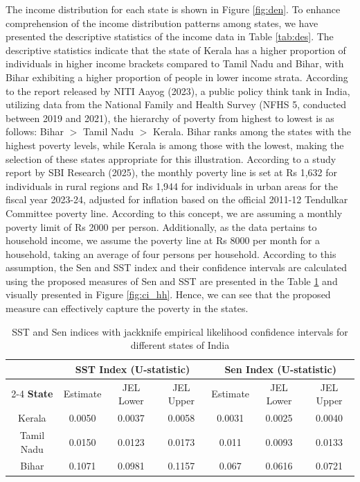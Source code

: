 \documentclass[11pt]{article}
\begin{document}
The income distribution for each state is shown in Figure \ref{fig:den}.  To enhance comprehension of the income distribution patterns among states, we have presented the descriptive statistics of the income data in Table \ref{tab:des}. The descriptive statistics indicate that the state of Kerala has a higher proportion of individuals in higher income brackets compared to Tamil Nadu and Bihar, with Bihar exhibiting a higher proportion of people in lower income strata. According to the report released by NITI Aayog (2023), a public policy think tank in India, utilizing data from the National Family and Health Survey (NFHS 5, conducted between 2019 and 2021), the hierarchy of poverty from highest to lowest is as follows: Bihar $>$ Tamil Nadu $>$ Kerala. Bihar ranks among the states with the highest poverty levels, while Kerala is among those with the lowest, making the selection of these states appropriate for this illustration. According to a study report by SBI Research (2025), the monthly poverty line is set at Rs 1,632 for individuals in rural regions and Rs 1,944 for individuals in urban areas for the fiscal year 2023-24, adjusted for inflation based on the official 2011-12 Tendulkar Committee poverty line. According to this concept, we are assuming a monthly poverty limit of Rs 2000 per person. Additionally, as the data pertains to household income, we assume the poverty line at Rs 8000 per month for a household, taking an average of four persons per household.   According to this assumption, the Sen and SST index and their confidence intervals are calculated using the proposed measures of Sen and SST are presented in the Table \ref{tab:sst_sen_jel_is} and visually presented in Figure \ref{fig:ci_hh}. Hence, we can see that the proposed measure can effectively capture the poverty in the states.
\begin{table}
\centering
\caption{SST and Sen  indices with jackknife empirical likelihood confidence intervals for different states of India}
\label{tab:sst_sen_jel_is}
\begin{tabular}{c ccc ccc}
\hline\hline
 & \multicolumn{3}{c}{\textbf{SST Index (U-statistic)}}
 & \multicolumn{3}{c}{\textbf{Sen Index (U-statistic)}} \\
\cline{2-4} \cline{5-7}
\textbf{State}
& Estimate & JEL Lower & JEL Upper
& Estimate & JEL Lower & JEL Upper \\
\hline
Kerala& 0.0050 & 0.0037 & 0.0058 & 0.0031 & 0.0025& 0.0040 \\
Tamil Nadu & 0.0150 & 0.0123& 0.0173 & 0.011 & 0.0093 & 0.0133 \\
Bihar & 0.1071 & 0.0981 & 0.1157 & 0.067 & 0.0616 & 0.0721 \\

\hline
\hline
\end{tabular}
\end{table}
\end{document}
